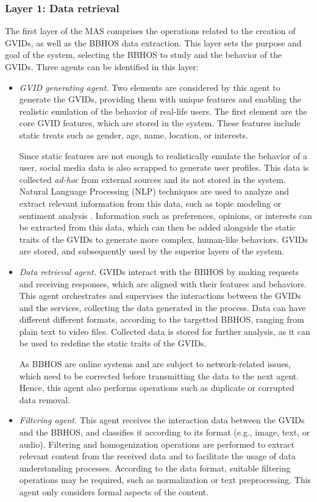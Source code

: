 \subsubsection*{Layer 1: Data retrieval}
The first layer of the MAS comprises the operations related to the creation of GVIDs, as well as the BBHOS data extraction. This layer sets the purpose and goal of the system, selecting the BBHOS to study and the behavior of the GVIDs. Three agents can be identified in this layer:
\begin{itemize}
    \item \textit{GVID generating agent.} Two elements are considered by this agent to generate the GVIDs, providing them with unique features and enabling the realistic emulation of the behavior of real-life users. The first element are the core GVID features, which are stored in the system. These features include static treats such as gender, age, name, location, or interests. 
    
    Since static features are not enough to realistically emulate the behavior of a user, social media data is also scrapped to generate user profiles. This data is collected \textit{ad-hoc} from external sources and its not stored in the system. Natural Language Processing (NLP) techniques are used to analyze and extract relevant information from this data, such as topic modeling \citep{Alghamdi2015} or sentiment analysis \citep{sentimentanalysis}. Information such as preferences, opinions, or interests can be extracted from this data, which can then be added alongside the static traits of the GVIDs to generate more complex, human-like behaviors. GVIDs are stored, and subsequently used by the superior layers of the system. 
    
    \item \textit{Data retrieval agent.} GVIDs interact with the BBHOS by making requests and receiving responses, which are aligned with their features and behaviors. This agent orchestrates and supervises the interactions between the GVIDs and the services, collecting the data generated in the process. Data can have different different formats, according to the targetted BBHOS, ranging from plain text to video files. Collected data is stored for further analysis, as it can be used to redefine the static traits of the GVIDs.
    
    As BBHOS are online systems and are subject to network-related issues, which need to be corrected before transmitting the data to the next agent. Hence, this agent also performs operations such as duplicate or corrupted data removal. 
    
    \item \textit{Filtering agent.} This agent receives the interaction data between the GVIDs and the BBHOS, and classifies it according to its format (e.g., image, text, or audio). Filtering and homogenization operations are performed to extract relevant content from the received data and to facilitate the usage of data understanding processes. According to the data format, suitable filtering operations may be required, such as normalization or text preprocessing. This agent only considers formal aspects of the content.
\end{itemize}

